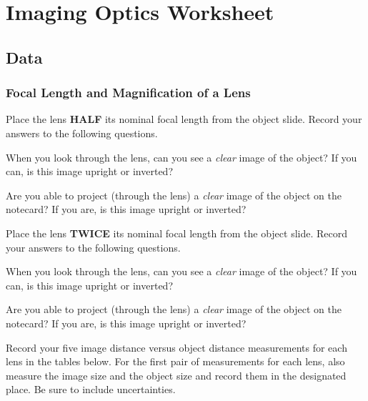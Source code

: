 \vfill
\pagebreak

\renewcommand{\thesection}{\thechapter.W}


\section{Imaging Optics Worksheet}
\subsection{Data}

\subsubsection{Focal Length and Magnification of a Lens}

Place the lens {\bf HALF} its nominal focal length from the object slide. 
Record your answers to the following questions.
\vspace*{.5cm}

\noindent
When you look through the lens, can you see a {\it clear} image of the object? If
you can, is this image upright or inverted?
\vspace*{1.5cm}

\noindent
Are you able to project (through the lens) a {\it clear} image of the object on the 
notecard? If you are, is this image upright or inverted?
\vspace*{1.5cm}

\noindent
Place the lens {\bf TWICE} its nominal focal length from the object slide. 
Record your answers to the following questions.
\vspace*{.5cm}

\noindent
When you look through the lens, can you see a {\it clear} image of the object? If
you can, is this image upright or inverted?
\vspace*{1.5cm}

\noindent
Are you able to project (through the lens) a {\it clear} image of the object on the 
notecard? If you are, is this image upright or inverted?


\newpage

\noindent
Record your five image distance versus object distance measurements for each
lens in the tables below. For the first pair of measurements for each lens, also
measure the image size and the object size and record them in the designated
place. Be sure to include uncertainties.

